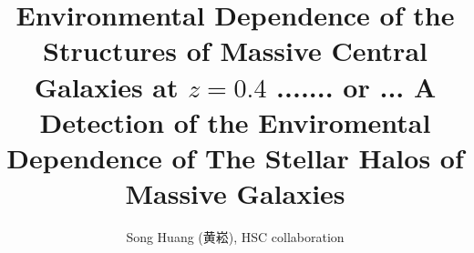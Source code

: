 \documentclass{emulateapj}
\newcommand{\todo}[1]{\textcolor{red}{\textbf{TODO:~#1}}}
\begin{document}
\begin{CJK*}{UTF8}{gbsn}



\title{Environmental Dependence of the Structures of Massive Central 
       Galaxies at $z=0.4$ ....... or ... A Detection of the Enviromental Dependence of The Stellar Halos of Massive Galaxies}



\author{Song Huang (黄崧), 
        HSC collaboration}   
        
        

\date{}                                          



\begin{abstract}
    

\end{abstract}
\end{CJK*}
\end{document}
